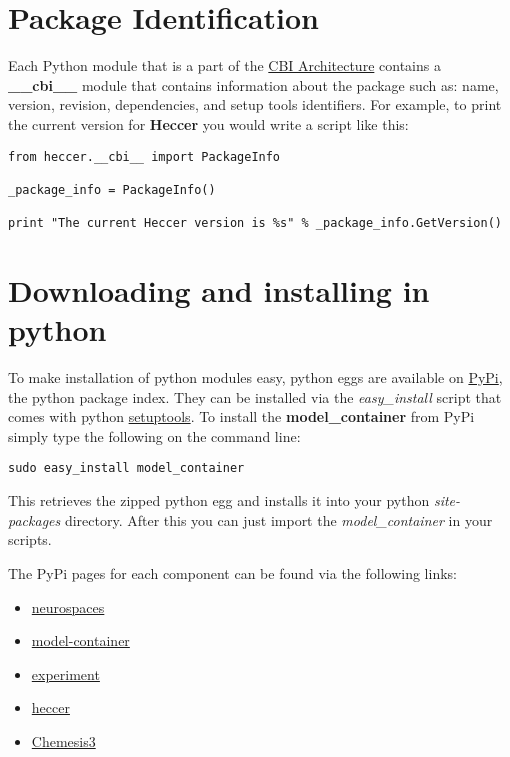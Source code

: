 \documentclass[12pt]{article}
\begin{document}
\section*{Package Identification}

	Each Python module that is a part of the \href{../cbi-architecture/cbi-architecture.tex}{CBI Architecture} contains a {\bf \_\_cbi\_\_} module that contains information about the package such as: name, version, revision, dependencies, and setup tools identifiers. For example, to print the current version for {\bf Heccer} you would write a script like this:
	
\begin{verbatim}
from heccer.__cbi__ import PackageInfo

_package_info = PackageInfo()

print "The current Heccer version is %s" % _package_info.GetVersion()

\end{verbatim}

\section*{Downloading and installing in python}

	To make installation of python modules easy, python eggs are available on \href{http://pypi.python.org/}{PyPi}, the python package index.  They can be installed via the {\it easy\_install} script that comes with python \href{http://pypi.python.org/pypi?:action=display&name=setuptools}{setuptools}. To install the {\bf model\_container} from PyPi simply type the following on the command line:
	
\begin{verbatim}
sudo easy_install model_container 
\end{verbatim}

This retrieves the zipped python egg and installs it into your python {\it site-packages} directory. After this you can just import the {\it model\_container} in your scripts. 

The PyPi pages for each component can be found via the following links:

\begin{itemize}
\item[] \href{http://pypi.python.org/pypi?:action=display&name=neurospaces}{neurospaces}
\item[] \href{http://pypi.python.org/pypi?:action=display&name=model-container}{model-container}
\item[] \href{http://pypi.python.org/pypi?:action=display&name=experiment}{experiment}
\item[] \href{http://pypi.python.org/pypi?:action=display&name=heccer}{heccer}
\item[] \href{http://pypi.python.org/pypi?:action=display&name=chemesis3}{Chemesis3}
\end{itemize}
\end{document}
